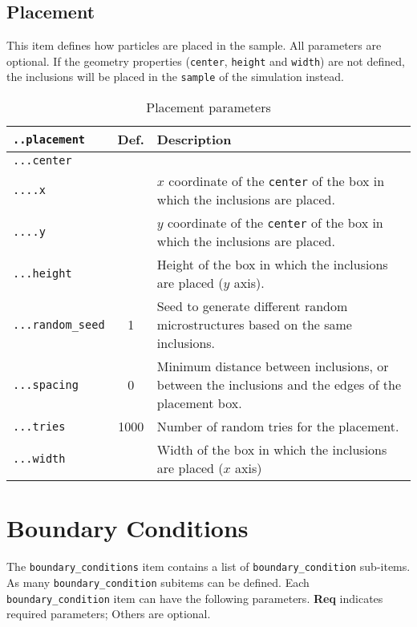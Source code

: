 \documentclass[10pt]{article}
\begin{document}
\subsection{Placement}

This item defines how particles are placed in the sample.
All parameters are optional.
If the geometry properties (\verb+center+, \verb+height+ and \verb+width+) are not defined, the inclusions will be placed in the \verb+sample+ of the simulation instead.

\begin{table}[h!]
\begin{tabularx}{\textwidth}{lcX}
\verb+..placement+ & Def. & Description\\
\hline
\verb+...center+ &  & \\	
\verb+....x+ &  & $x$ coordinate of the \verb+center+ of the box in which the inclusions are placed.\\
\verb+....y+ &  & $y$ coordinate of the \verb+center+ of the box in which the inclusions are placed.\\
\verb+...height+ & & Height of the box in which the inclusions are placed ($y$ axis).\\
\verb+...random_seed+ & 1 & Seed to generate different random microstructures based on the same inclusions.\\
\verb+...spacing+ & 0 & Minimum distance between inclusions, or between the inclusions and the edges of the placement box.\\
\verb+...tries+ & 1000 & Number of random tries for the placement.\\
\verb+...width+ & & Width of the box in which the inclusions are placed ($x$ axis)\\
\hline
\end{tabularx}
\caption{Placement parameters}
\end{table}

\section{Boundary Conditions}

The \verb+boundary_conditions+ item contains a list of \verb+boundary_condition+ sub-items.
As many \verb+boundary_condition+ subitems can be defined.
Each \verb+boundary_condition+ item can have the following parameters.
\textbf{Req} indicates required parameters; Others are optional.
\end{document}
